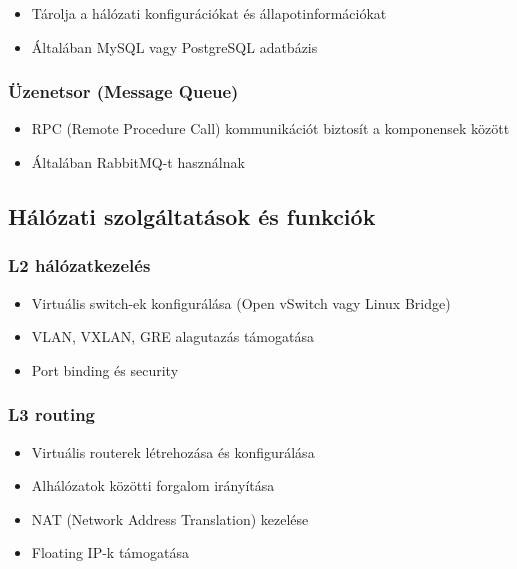 \documentclass[a4paper,12pt]{article}
\begin{document}
    \begin{itemize}
        \item Tárolja a hálózati konfigurációkat és állapotinformációkat
        \item Általában MySQL vagy PostgreSQL adatbázis
    \end{itemize}

    \subsubsection{Üzenetsor (Message Queue)}

    \begin{itemize}
        \item RPC (Remote Procedure Call) kommunikációt biztosít a komponensek között
        \item Általában RabbitMQ-t használnak
    \end{itemize}

    \subsection{Hálózati szolgáltatások és funkciók}

    \subsubsection{L2 hálózatkezelés}

    \begin{itemize}
        \item Virtuális switch-ek konfigurálása (Open vSwitch vagy Linux Bridge)
        \item VLAN, VXLAN, GRE alagutazás támogatása
        \item Port binding és security
    \end{itemize}

    \subsubsection{L3 routing}

    \begin{itemize}
        \item Virtuális routerek létrehozása és konfigurálása
        \item Alhálózatok közötti forgalom irányítása
        \item NAT (Network Address Translation) kezelése
        \item Floating IP-k támogatása
    \end{itemize}
\end{document}
